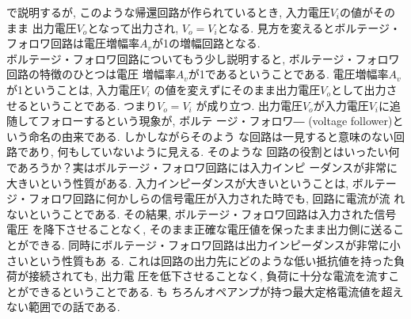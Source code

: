 \documentclass[uplatex,a4paper,11pt,dvipdfmxs]{jsarticle}
\begin{document}
\begin{enumerate}
    で説明するが, このような帰還回路が作られているとき, 入力電圧\(V_i\)の値がそのまま
    出力電圧\(V_o\)となって出力され, \(V_o=V_i\)となる. 見方を変えるとボルテージ・フォロワ回路は電圧増幅率\(A_v\)が1の増幅回路となる. \\
    \quad ボルテージ・フォロワ回路についてもう少し説明すると, ボルテージ・フォロワ回路の特徴のひとつは電圧
    増幅率\(A_v\)が1であるということである. 電圧増幅率\(A_v\)が1ということは, 入力電圧\(V_i\)
    の値を変えずにそのまま出力電圧\(V_o\)として出力させるということである. つまり\(V_o=V_i\)
    が成り立つ. 出力電圧\(V_o\)が入力電圧\(V_i\)に追随してフォローするという現象が, ボルテ
    ージ・フォロワ― (voltage follower)という命名の由来である. しかしながらそのよう
    な回路は一見すると意味のない回路であり, 何もしていないように見える. そのような
    回路の役割とはいったい何であろうか？実はボルテージ・フォロワ回路には入力インピ
    ーダンスが非常に大きいという性質がある. 入力インピーダンスが大きいということは, 
    ボルテージ・フォロワ回路に何かしらの信号電圧が入力された時でも, 回路に電流が流
    れないということである. その結果, ボルテージ・フォロワ回路は入力された信号電圧
    を降下させることなく, そのまま正確な電圧値を保ったまま出力側に送ることができる. 
    同時にボルテージ・フォロワ回路は出力インピーダンスが非常に小さいという性質もあ
    る. これは回路の出力先にどのような低い抵抗値を持った負荷が接続されても, 出力電
    圧を低下させることなく, 負荷に十分な電流を流すことができるということである. も
    ちろんオペアンプが持つ最大定格電流値を超えない範囲での話である. \\


\end{enumerate}
\end{document}
